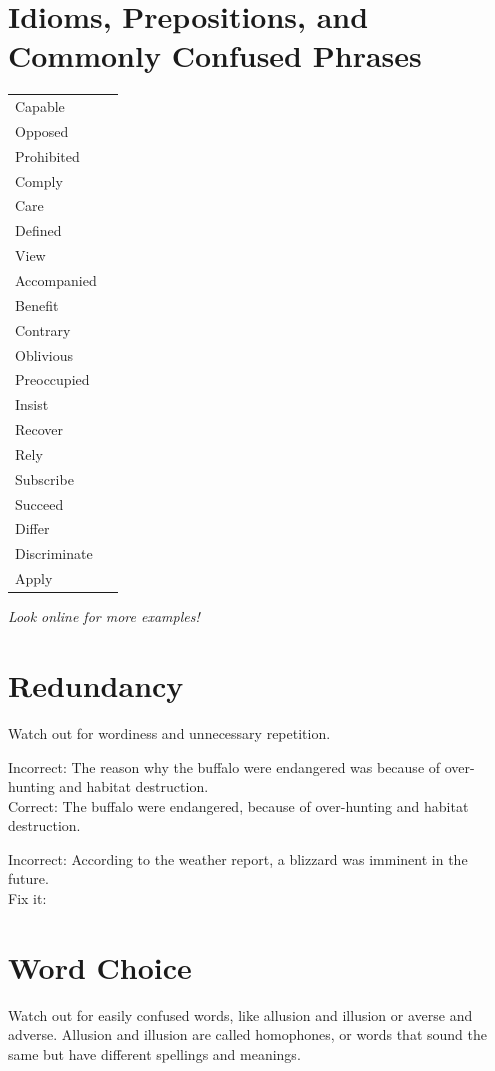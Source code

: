 \documentclass[12pt]{book}
\newcommand{\longline}{\underline{\hspace{2in}} }
\begin{document}
\section{Idioms, Prepositions, and Commonly Confused Phrases}

\begin{spacing}{2}
\begin{tabular}{@{}ll<{\longline\arraybackslash}}
Capable&\\
Opposed&\\
Prohibited&\\
Comply&\\
Care&\\
Defined&\\
View&\\
Accompanied&\\
Benefit&\\
Contrary&\\
Oblivious&\\
Preoccupied&\\
Insist&\\
Recover&\\
Rely&\\
Subscribe&\\
Succeed&\\
Differ&\\
Discriminate&\\
Apply&
\end{tabular}
\end{spacing}

\textit{Look online for more examples!}

\section{Redundancy}
Watch out for wordiness and unnecessary repetition.

\bigskip
Incorrect:  The reason why the buffalo were endangered was because of over-hunting and habitat destruction.\\
Correct:  The buffalo were endangered, because of over-hunting and habitat destruction.

\bigskip
Incorrect:  According to the weather report, a blizzard was imminent in the future.\\
Fix it: \hrulefill

\section{Word Choice}
Watch out for easily confused words, like allusion and illusion or averse and adverse.  Allusion and illusion are called homophones, or words that sound the same but have different spellings and meanings.
\end{document}
